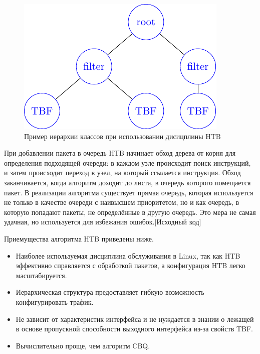         \begin{figure}[ht!]
            \center
            \includegraphics{./pdfimages/class_hierh_htb.pdf}
            \caption{Пример иерархии классов при использовании дисицплины HTB}
			\label{pic:htb_hier}
        \end{figure}

        При добавлении пакета в очередь HTB начинает обход дерева от корня
        для определения подходящей очереди: в каждом узле происходит поиск
        инструкций, и затем происходит переход в узел, на который ссылается
        инструкция. Обход заканчивается, когда алгоритм доходит до листа,
        в очередь которого помещается пакет.\cite{tchtb} В реализации алгоритма
		существует прямая очередь, которая используется не только в качестве
		очереди с наивысшем приоритетом, но и как очередь, в которую попадают
		пакеты, не определённые в другую очередь. Это мера не самая удачная,
		но используется для избежания ошибок.[Исходный код]

        Приемущества алгоритма HTB приведены ниже.
        \begin{itemize}
            \item Наиболее используемая дисциплина обслуживания в Linux, так как HTB эффективно
				  справляется с обработкой пакетов, а конфигурация HTB легко масштабируется.\cite{lartc}
            \item Иерархическая структура предоставляет гибкую возможность конфигурировать трафик.
            \item Не зависит от характеристик интерфейса и не нуждается в знании о лежащей в
                  основе пропускной способности выходного интерфейса из-за свойств TBF. \cite{tchtb}
            \item Вычислительно проще, чем алгоритм CBQ.\cite{htb}
        \end{itemize}

